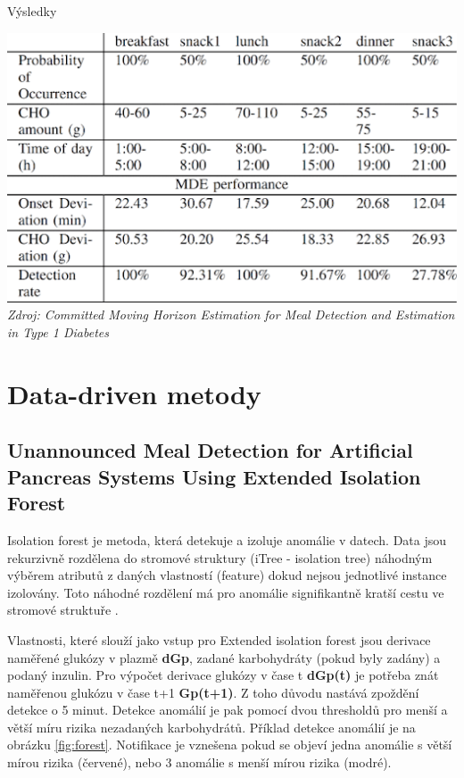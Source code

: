 \begin{table}[H]
\caption{Výsledky}
\label{tab:horizon5}
\centering
\includegraphics[width=1\textwidth]{img/analyza/horizon5.png}\\
\textit{Zdroj: Committed Moving Horizon Estimation for Meal Detection and Estimation in Type 1 Diabetes \citep{Analyza.MovingHorizon}}
\end{table}


\section{Data-driven metody}
\subsection{Unannounced Meal Detection for Artificial Pancreas Systems Using Extended Isolation Forest}
\label{ch:forest}

Isolation forest je metoda, která detekuje a izoluje anomálie v datech. Data jsou rekurzivně rozdělena do stromové struktury (iTree - isolation tree) náhodným výběrem atributů z daných vlastností (feature) dokud nejsou jednotlivé instance izolovány. Toto náhodné rozdělení má pro anomálie signifikantně kratší cestu ve stromové struktuře \citep{Analyza.IsolationForest}.

Vlastnosti, které slouží jako vstup pro Extended isolation forest \citep{Analyza.ExtendedIsolationForest} jsou derivace naměřené glukózy v plazmě \textbf{dGp}, zadané karbohydráty (pokud byly zadány) a podaný inzulin. Pro výpočet derivace glukózy v čase t \textbf{dGp(t)} je potřeba znát naměřenou glukózu v čase t+1 \textbf{Gp(t+1)}. Z toho důvodu nastává zpoždění detekce o 5 minut. Detekce anomálií je pak pomocí dvou thresholdů pro menší a větší míru rizika nezadaných karbohydrátů.
Příklad detekce anomálií je na obrázku \ref{fig:forest}. Notifikace je vznešena pokud se objeví jedna anomálie s větší mírou rizika (červené), nebo 3 anomálie s menší mírou rizika (modré).

